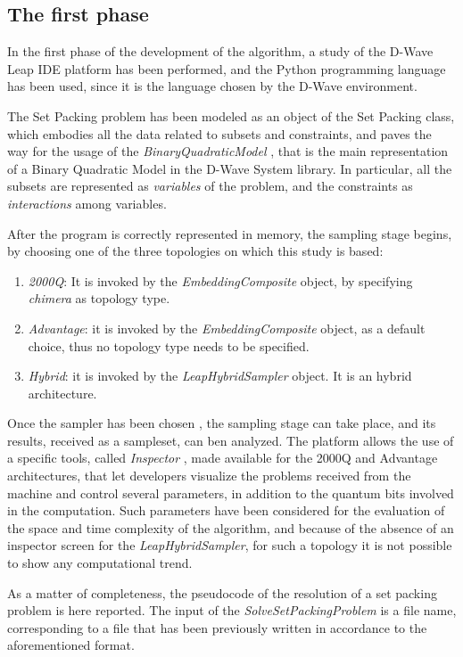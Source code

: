 \documentclass[oneside,a4paper]{article}
\begin{document}
\subsection{The first phase}
In the first phase of the development of the algorithm, a study of the D-Wave Leap IDE platform has been performed, and the Python programming language has been used, since it is the language chosen by the D-Wave environment. 

The Set Packing problem has been modeled as an object of the Set Packing class, which embodies all the data related to subsets and constraints, and paves the way for the usage of the \textit{BinaryQuadraticModel} \cite{WebSite10}, that is the main representation of a Binary Quadratic Model in the D-Wave System library. In particular, all the subsets are represented as \textit{variables} of the problem, and the constraints as \textit{interactions} among variables.

After the program is correctly represented in memory, the sampling stage begins, by choosing one of the three topologies on which this study is based:
\begin{enumerate}
    \item \textit{2000Q}: It is invoked by the \textit{EmbeddingComposite} object, by specifying \textit{chimera} as topology type.
    \item \textit{Advantage}: it is invoked by the \textit{EmbeddingComposite} object, as a default choice, thus no topology type needs to be specified.
    \item \textit{Hybrid}: it is invoked by the \textit{LeapHybridSampler} object. It is an hybrid architecture.
\end{enumerate}

Once the sampler has been chosen \cite{WebSite11}, the sampling stage can take place, and its results, received as a sampleset, can ben analyzed. The platform allows the use of a specific tools, called \textit{Inspector} \cite{WebSite12}, made available for the 2000Q and Advantage architectures, that let developers visualize the problems received from the machine and control several parameters, in addition to the quantum bits involved in the computation. Such parameters have been considered for the evaluation of the space and time complexity of the algorithm, and because of the absence of an inspector screen for the \textit{LeapHybridSampler}, for such a topology it is not possible to show any computational trend.

As a matter of completeness, the pseudocode of the resolution of a set packing problem is here reported. The input of the \textit{SolveSetPackingProblem} is a file name, corresponding to a file that has been previously written in accordance to the aforementioned format.
\end{document}
